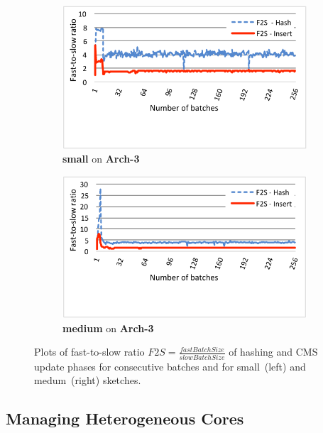 \documentclass[runningheads]{llncs}
\begin{document}
\begin{figure}[htbp]
	\begin{subfigure}[t]{0.49\textwidth}
		\includegraphics[width=\linewidth]{f2s-small.pdf}
		\caption{{\bf small} on {\bf Arch-3}}
		\label{fig:fs-small}
	\end{subfigure}\hspace*{3ex}
	\begin{subfigure}[t]{0.49\textwidth}
		\includegraphics[width=\linewidth]{f2s-big.pdf}
		\caption{{\bf medium} on {\bf Arch-3}}
		\label{fig:fs-large}
	\end{subfigure}
	
	\caption{\small{Plots of fast-to-slow ratio $F2S = \frac{fastBatchSize}{slowBatchSize}$ of hashing and CMS update phases for consecutive batches and for small~(left) and medum~(right) sketches.}}
	\label{fig:load}
	\vspace*{-6ex}
\end{figure}


\subsection{Managing Heterogeneous Cores} 
\end{document}
